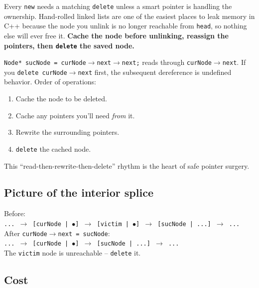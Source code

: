 \documentclass[11pt]{article}
\begin{document}
\begin{warnbox}
Every \texttt{new} needs a matching \texttt{delete} unless a smart
pointer is handling the ownership. Hand-rolled linked lists are one
of the easiest places to leak memory in C++ because the node you
unlink is no longer reachable from \texttt{head}, so nothing else
will ever free it. \textbf{Cache the node before unlinking,
reassign the pointers, then \texttt{delete} the saved node.}
\end{warnbox}

\begin{warnbox}
\texttt{Node* sucNode = curNode$\to$next$\to$next;} reads through
\texttt{curNode$\to$next}. If you \texttt{delete curNode$\to$next}
first, the subsequent dereference is undefined behavior. Order of
operations:
\begin{enumerate}[leftmargin=*]
  \item Cache the node to be deleted.
  \item Cache any pointers you'll need \emph{from} it.
  \item Rewrite the surrounding pointers.
  \item \texttt{delete} the cached node.
\end{enumerate}
This ``read-then-rewrite-then-delete'' rhythm is the heart of
safe pointer surgery.
\end{warnbox}

\subsection*{Picture of the interior splice}

\begin{center}
\footnotesize
Before:\\
\texttt{... $\to$ [curNode | $\bullet$] $\to$ [victim | $\bullet$] $\to$ [sucNode | ...] $\to$ ...}
\\[0.5em]
After \texttt{curNode$\to$next = sucNode}:\\
\texttt{... $\to$ [curNode | $\bullet$] $\to$ [sucNode | ...] $\to$ ...}
\\[0.5em]
The \texttt{victim} node is unreachable -- \texttt{delete} it.
\end{center}

\subsection{Cost}
\end{document}
